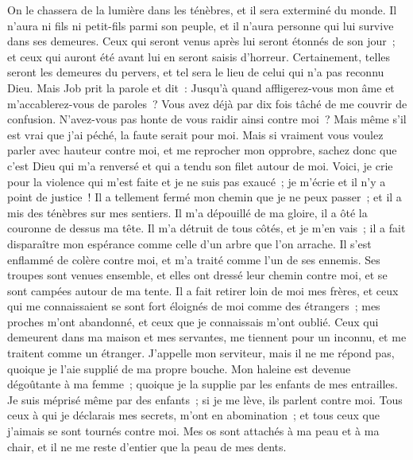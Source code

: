 \begin{multicols}{2}
On le chassera de la lumière dans les ténèbres, et il sera exterminé du monde. 
Il n'aura ni fils ni petit-fils parmi son peuple, et il n'aura personne qui lui survive dans ses demeures. 
Ceux qui seront venus après lui seront étonnés de son jour~; et ceux qui auront été avant lui en seront saisis d'horreur. 
Certainement, telles seront les demeures du pervers, et tel sera le lieu de celui qui n'a pas reconnu Dieu.
\VerseOne{}Mais Job prit la parole et dit~:
Jusqu'à quand affligerez-vous mon âme et m'accablerez-vous de paroles~? 
Vous avez déjà par dix fois tâché de me couvrir de confusion. N'avez-vous pas honte de vous raidir ainsi contre moi~? 
Mais même s'il est vrai que j'ai péché, la faute serait pour moi. 
Mais si vraiment vous voulez parler avec hauteur contre moi, et me reprocher mon opprobre, 
sachez donc que c'est Dieu qui m'a renversé et qui a tendu son filet autour de moi. 
Voici, je crie pour la violence qui m'est faite et je ne suis pas exaucé~; je m'écrie et il n'y a point de justice~!
Il a tellement fermé mon chemin que je ne peux passer~; et il a mis des ténèbres sur mes sentiers. 
Il m'a dépouillé de ma gloire, il a ôté la couronne de dessus ma tête.
Il m'a détruit de tous côtés, et je m'en vais~; il a fait disparaître mon espérance comme celle d'un arbre que l'on arrache. 
Il s'est enflammé de colère contre moi, et m'a traité comme l'un de ses ennemis.
Ses troupes sont venues ensemble, et elles ont dressé leur chemin contre moi, et se sont campées autour de ma tente.
Il a fait retirer loin de moi mes frères, et ceux qui me connaissaient se sont fort éloignés de moi comme des étrangers~;
mes proches m'ont abandonné, et ceux que je connaissais m'ont oublié.
Ceux qui demeurent dans ma maison et mes servantes, me tiennent pour un inconnu, et me traitent comme un étranger. 
J'appelle mon serviteur, mais il ne me répond pas, quoique je l'aie supplié de ma propre bouche.
Mon haleine est devenue dégoûtante à ma femme~; quoique je la supplie par les enfants de mes entrailles.
Je suis méprisé même par des enfants~; si je me lève, ils parlent contre moi.
Tous ceux à qui je déclarais mes secrets, m'ont en abomination~; et tous ceux que j'aimais se sont tournés contre moi.
Mes os sont attachés à ma peau et à ma chair, et il ne me reste d'entier que la peau de mes dents.

\end{multicols}
